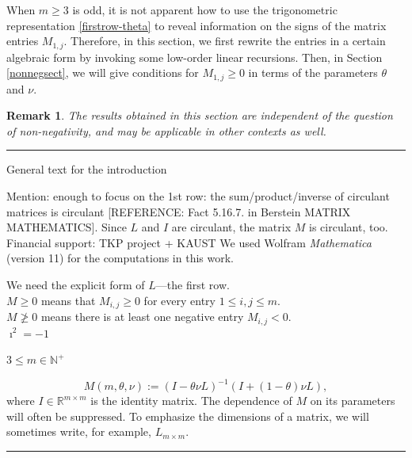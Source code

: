 \documentclass[a4paper]{article}
\newtheorem{remark}{Remark}
\newcommand{\te}{\theta}
\newcommand{\nplus}{\mathbb{N}^+}
\newcommand{\rr}{\mathbb{R}}
\begin{document}
When $m\ge 3$ is odd, it is not apparent how to use the trigonometric representation \eqref{firstrow-theta} to reveal information on the signs of the matrix entries $M_{1,j}$. Therefore, in this section, we first rewrite the  entries in a certain algebraic form by invoking some low-order linear recursions. Then, in Section \ref{nonnegsect}, we will give conditions for $M_{1,j}\ge 0$ in terms of the parameters $\te$ and $\nu$.
\begin{remark}
The results obtained in this section are independent of the question of non-negativity, and may be applicable in other contexts as well. 
\end{remark}

\rule{8cm}{0.4pt}

General text for the introduction

 Mention: enough to focus on the 1st row: the sum/product/inverse of circulant matrices is circulant [REFERENCE: Fact 5.16.7. in Berstein MATRIX MATHEMATICS]. Since $L$ and $I$ are circulant, the matrix $M$ is circulant, too.\\
Financial support: TKP project + KAUST
We used Wolfram \textit{Mathematica} (version 11) for the computations in this work.




 We need the explicit form of $L$---the first row.\\

$M\ge 0$ means that  $M_{i,j}\ge 0$ for every entry $1\le i, j\le m$.\\

$M\not\ge 0$ means there is at least one negative entry $M_{i,j}<0$.\\

$\imath^2=-1$ 

$3\le m\in\nplus$

\begin{equation}\label{Mdef}
M(m,\te,\nu):=(I-\te\nu L)^{-1}(I+(1-\te)\nu L),
\end{equation}
where $I\in\rr^{m\times m}$ is the identity matrix. The dependence of $M$ on its parameters will often be suppressed. To emphasize the dimensions of a matrix, we will sometimes write, for example, $L_{m\times m}$.

\rule{8cm}{0.4pt}
\end{document}

